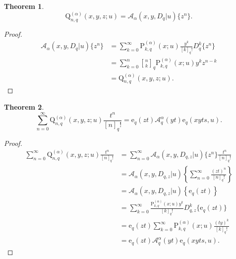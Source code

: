 \documentclass[12pt]{article}
\newcommand{\qbinom}{\genfrac{[}{]}{0pt}{}}
\newcommand{\e}{\mathrm{e}}
\newcommand{\A}{\mathcal{A}}
\newcommand{\p}{\mathrm{P}}
\newcommand{\q}{\mathrm{Q}}
\newcommand{\Aa}{\mathscr{A}}
\newtheorem{theorem}{Theorem}
\begin{document}
\begin{theorem}
    \begin{equation}
        \q_{n,q}^{(\alpha)}(x,y,z;u)=\Aa_{\alpha}(x,y,D_{q}|u)\{z^n\}.
    \end{equation}
\end{theorem}
\begin{proof}
    \begin{align*}
        \Aa_{\alpha}(x,y,D_{q}|u)\{z^{n}\}&=\sum_{k=0}^{\infty}\p_{k,q}^{(\alpha)}(x;u)\frac{y^{k}}{[k]_{q}!}D_{q}^{k}\{z^n\}\\
        &=\sum_{k=0}^{n}\qbinom{n}{k}_{q}\p_{k,q}^{(\alpha)}(x;u)y^kz^{n-k}\\
        &=\q_{n,q}^{(\alpha)}(x,y,z;u).
    \end{align*}
\end{proof}

\begin{theorem}
    \begin{equation}
        \sum_{n=0}^{\infty}\q_{n,q}^{(\alpha)}(x,y,z;u)\frac{t^{n}}{[n]_{q}!}=\e_{q}(zt)\A_{q}^{\alpha}(yt)\e_{q}(xyts,u).
    \end{equation}
\end{theorem}
\begin{proof}
   \begin{align*}
       \sum_{n=0}^{\infty}\q_{n,q}^{(\alpha)}(x,y,z;u)\frac{t^{n}}{[n]_{q}!}&=\sum_{n=0}^{\infty}\Aa_{\alpha}(x,y,D_{q,z}|u)\{z^{n}\}\frac{t^{n}}{[n]_{q}!}\\
       &=\Aa_{\alpha}(x,y,D_{q,z}|u)\left\{\sum_{n=0}^{\infty}\frac{(zt)^n}{[n]_{q}!}\right\}\\
       &=\Aa_{\alpha}(x,y,D_{q,z}|u)\left\{\e_{q}(zt)\right\}\\
       &=\sum_{k=0}^{\infty}\frac{\p_{k,q}^{(\alpha)}(x;u)y^{k}}{[k]_{q}!}D_{q,z}^{k}\{\e_{q}(zt)\}\\
       &=\e_{q}(zt)\sum_{k=0}^{\infty}\p_{k,q}^{(\alpha)}(x;u)\frac{(ty)^{k}}{[k]_{q}!}\\
       &=\e_{q}(zt)\A_{q}^{\alpha}(yt)\e_{q}(xyts,u).
   \end{align*} 
\end{proof}
\end{document}
